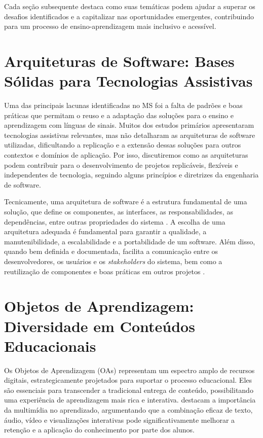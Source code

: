 Cada seção subsequente destaca como suas temáticas podem ajudar a superar os desafios identificados e a capitalizar nas oportunidades emergentes, contribuindo para um processo de ensino-aprendizagem mais inclusivo e acessível.

\section{Arquiteturas de Software: Bases Sólidas para Tecnologias Assistivas}
\label{section:foundation:arch}

Uma das principais lacunas identificadas no MS foi a falta de padrões e boas práticas que permitam o reuso e a adaptação das soluções para o ensino e aprendizagem com línguas de sinais. Muitos dos estudos primários apresentaram tecnologias assistivas relevantes, mas não detalharam as arquiteturas de software utilizadas, dificultando a replicação e a extensão dessas soluções para outros contextos e domínios de aplicação. Por isso, discutiremos como as arquiteturas podem contribuir para o desenvolvimento de projetos replicáveis, flexíveis e independentes de tecnologia, seguindo alguns princípios e diretrizes da engenharia de software.

Tecnicamente, uma arquitetura de software é a estrutura fundamental de uma solução, que define os componentes, as interfaces, as responsabilidades, as dependências, entre outras propriedades do sistema \cite{Bass2021}. A escolha de uma arquitetura adequada é fundamental para garantir a qualidade, a manutenibilidade, a escalabilidade e a portabilidade de um software. Além disso, quando bem definida e documentada, facilita a comunicação entre os desenvolvedores, os usuários e os \textit{stakeholders} do sistema, bem como a reutilização de componentes e boas práticas em outros projetos \cite{Sommerville2015, Pressman2016}.

\section{Objetos de Aprendizagem: Diversidade em Conteúdos Educacionais}
\label{section:foundation:lo}

Os Objetos de Aprendizagem (OAs) representam um espectro amplo de recursos digitais, estrategicamente projetados para suportar o processo educacional. Eles são essenciais para transcender a tradicional entrega de conteúdo, possibilitando uma experiência de aprendizagem mais rica e interativa.  destacam a importância da multimídia no aprendizado, argumentando que a combinação eficaz de texto, áudio, vídeo e visualizações interativas pode significativamente melhorar a retenção e a aplicação do conhecimento por parte dos alunos.

